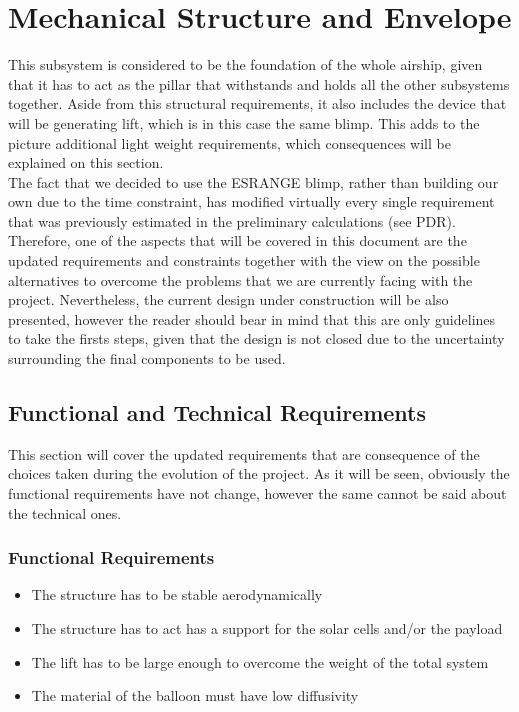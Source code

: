 \chapter{Mechanical Structure and Envelope}
\label{chap:mse}

This subsystem is considered to be the foundation of the whole airship, given that it has to act as the pillar that withstands and holds all the other subsystems together. Aside from this structural requirements, it also includes the device that will be generating lift, which is in this case the same blimp. This adds to the picture additional light weight requirements, which consequences will be explained on this section.\\ 

The fact that we decided to use the ESRANGE blimp, rather than building our own due to the time constraint, has modified virtually every single requirement that was previously estimated in the preliminary calculations (see PDR). Therefore, one of the aspects that will be covered in this document are the updated requirements and constraints together with the view on the possible alternatives to overcome the problems that we are currently facing with the project. Nevertheless, the current design under construction will be also presented, however the reader should bear in mind that this are only guidelines to take the firsts steps, given that the design is not closed due to the uncertainty surrounding the final components to be used. 

\section{Functional and Technical Requirements}

This section will cover the updated requirements that are consequence of the choices taken during the evolution of the project. As it will be seen, obviously the functional requirements have not change, however the same cannot be said about the technical ones. 

\subsection{Functional Requirements}

\begin{itemize}
\item The structure has to be stable aerodynamically
\item The structure has to act has a support for the solar cells and/or the payload
\item The lift has to be large enough to overcome the weight of the total system
\item The material of the balloon must have low diffusivity
\end{itemize}


